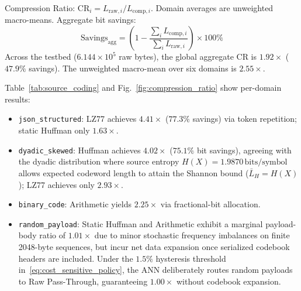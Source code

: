 \documentclass[conference]{IEEEtran}
\begin{document}
Compression Ratio: $\text{CR}_i = L_{\text{raw},i}/L_{\text{comp},i}$. Domain averages are unweighted macro-means. Aggregate bit savings:
\begin{equation}
    \text{Savings}_{\text{agg}} = \left( 1 - \frac{\sum_i L_{\text{comp},i}}{\sum_i L_{\text{raw},i}} \right) \times 100\%
\end{equation}
Across the testbed ($6.144 \times 10^5$ raw bytes), the global aggregate CR is $\mathbf{1.92\times}$ ($47.9\%$ savings). The unweighted macro-mean over six domains is $\mathbf{2.55\times}$.

Table~\ref{tab:source_coding} and Fig.~\ref{fig:compression_ratio} show per-domain results:
\begin{itemize}
    \item \texttt{json\_structured}: LZ77 achieves $\mathbf{4.41\times}$ ($77.3\%$ savings) via token repetition; static Huffman only $1.63\times$.
    \item \texttt{dyadic\_skewed}: Huffman achieves $\mathbf{4.02\times}$ ($75.1\%$ bit savings), agreeing with the dyadic distribution where source entropy $H(X) = 1.9870\,\text{bits/symbol}$ allows expected codeword length to attain the Shannon bound ($\bar{L}_H = H(X)$); LZ77 achieves only $2.93\times$.
    \item \texttt{binary\_code}: Arithmetic yields $\mathbf{2.25\times}$ via fractional-bit allocation.
    \item \texttt{random\_payload}: Static Huffman and Arithmetic exhibit a marginal payload-body ratio of $1.01\times$ due to minor stochastic frequency imbalances on finite 2048-byte sequences, but incur net data expansion once serialized codebook headers are included. Under the $1.5\%$ hysteresis threshold in~\eqref{eq:cost_sensitive_policy}, the ANN deliberately routes random payloads to Raw Pass-Through, guaranteeing $1.00\times$ without codebook expansion.
\end{itemize}
\end{document}

